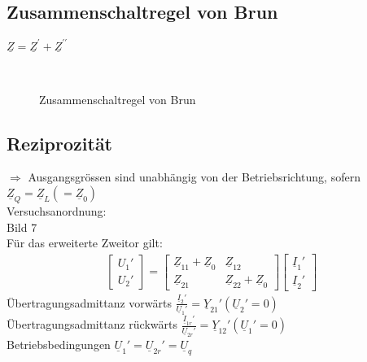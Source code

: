 \subsection{Zusammenschaltregel von Brun}
$\underline{Z} = \underline{Z}^\prime + \underline{Z}^{\prime\prime}$\\
\begin{figure}[!h]
\centering
{}
\qquad
{}\\
\caption{Zusammenschaltregel von Brun}
\label{fig:zweitor:regelvbrun}
\end{figure}

\subsection{Reziprozität}
$\Rightarrow$ Ausgangsgrössen sind unabhängig von der Betriebsrichtung, sofern
$\underline{Z}_{Q}=\underline{Z}_{L} \left(=\underline{Z}_{0}\right)$\\
Versuchsanordnung:\\
Bild 7\\
Für das erweiterte Zweitor gilt:\\
\begin{align}
	\begin{bmatrix}
		U_1'\\
		U_2'
	\end{bmatrix}
	=	
	\begin{bmatrix}
		\underline{Z}_{11}+\underline{Z}_{0} & \underline{Z}_{12}\\
		\underline{Z}_{21} & \underline{Z}_{22}+\underline{Z}_0
	\end{bmatrix}
	\begin{bmatrix}
		\underline{I}_1'\\
		\underline{I}_2'
	\end{bmatrix}\nonumber
\end{align}
Übertragungsadmittanz vorwärts $\frac{\underline{I}_{2}'}{\underline{U}_{1}'}=\underline{Y}_{21}'
	(\underline{U}_{2}'=0)$\\
Übertragungsadmittanz rückwärts
$\frac{\underline{I}_{1r}'}{\underline{U}_{2r}'}=\underline{Y}_{12}'
(\underline{U}_{1}'=0)$\\
Betriebsbedingungen $\underline{U}_{1}'=\underline{U}_{2r}'=\underline{U}_{q}$\\
